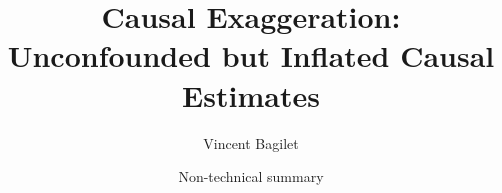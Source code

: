 \documentclass[usletter, 12pt]{article}
\begin{document}

	
	\title{Causal Exaggeration: \\ Unconfounded but Inflated Causal Estimates}
	
	\subtitle{\normalsize Vincent Bagilet}

	\author{\large Non-technical summary}
	
	\date{}
	
	\maketitle
	
	
				
\end{document}
